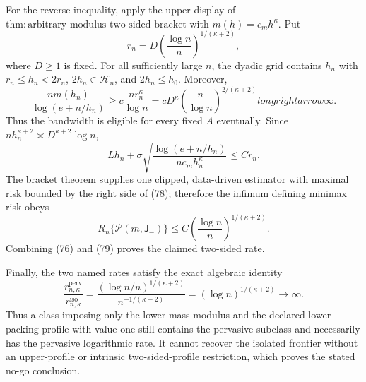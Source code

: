 For the reverse inequality, apply the upper display of \(\mathrm{thm:arbitrary\text{-}modulus\text{-}two\text{-}sided\text{-}bracket}\) with \(m(h)=c_mh^\kappa\). Put
\[
 r_n=D\left(\frac{\log n}{n}\right)^{1/(\kappa+2)},
\]
where \(D\ge1\) is fixed. For all sufficiently large \(n\), the dyadic grid contains \(h_n\) with \(r_n\le h_n<2r_n\), \(2h_n\in\mathcal H_n\), and \(2h_n\le h_0\). Moreover,
\[
 \frac{nm(h_n)}{\log(e+n/h_n)}
 \ge c\frac{n r_n^\kappa}{\log n}
 =cD^\kappa\left(\frac n{\log n}\right)^{2/(\kappa+2)}longrightarrow\infty. \tag{77}
\]
Thus the bandwidth is eligible for every fixed \(A\) eventually. Since \(nh_n^{\kappa+2}\asymp D^{\kappa+2}\log n\),
\[
 Lh_n+\sigma\sqrt{\frac{\log(e+n/h_n)}{nc_mh_n^\kappa}}
 \le C r_n. \tag{78}
\]
The bracket theorem supplies one clipped, data-driven estimator with maximal risk bounded by the right side of (78); therefore the infimum defining minimax risk obeys
\[
 R_n\{\mathcal P(m,\mathsf J_{-})\}
 \le C\left(\frac{\log n}{n}\right)^{1/(\kappa+2)}. \tag{79}
\]
Combining (76) and (79) proves the claimed two-sided rate.

Finally, the two named rates satisfy the exact algebraic identity
\[
 \frac{r_{n,\kappa}^{\mathrm{perv}}}{r_{n,\kappa}^{\mathrm{iso}}}
 =\frac{(\log n/n)^{1/(\kappa+2)}}{n^{-1/(\kappa+2)}}
 =(\log n)^{1/(\kappa+2)}\longrightarrow\infty. \tag{80}
\]
Thus a class imposing only the lower mass modulus and the declared lower packing profile with value one still contains the pervasive subclass and necessarily has the pervasive logarithmic rate. It cannot recover the isolated frontier without an upper-profile or intrinsic two-sided-profile restriction, which proves the stated no-go conclusion.